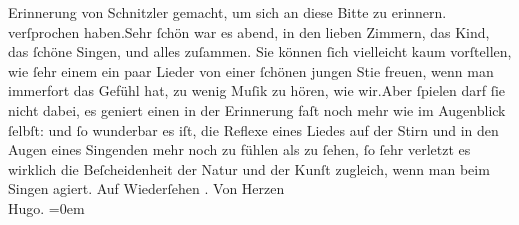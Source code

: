 \begin{ledgroupsized}[t]{13cm}
{{{                  Erinnerung von Schnitzler gemacht, um sich an diese
                  Bitte zu erinnern.}}}\label{T_L01319-1h} verſprochen haben.\hspace*{1.5em}Sehr ſchön war es \label{K_L01319-2v}\label{K_L01319-2h} abend, in den lieben Zimmern, das Kind, das ſchöne Singen, und alles zuſammen. Sie können
               ſich vielleicht kaum vorſtellen, wie ſehr einem ein paar Lieder von einer ſchönen
               jungen Sti{\geminationm}e freuen, wenn {\pb}man immerfort das Gefühl hat, zu
               wenig Muſik zu hören, wie wir.\hspace*{1.5em}Aber ſpielen darf ſie
               nicht dabei, es geniert einen in der Erinnerung faſt noch mehr wie im Augenblick
               ſelbſt: und ſo wunderbar es iſt, die Reflexe eines Liedes auf der Stirn und in den
               Augen eines Singenden mehr noch zu fühlen als zu ſehen, ſo ſehr {\pb}verletzt es wirklich die
               Beſcheidenheit der Natur und der Kunſt zugleich, wenn man beim Singen agiert.\pend
           \pstart
           Auf Wiederſehen \label{K_L01319-3v}\label{K_L01319-3h}.\pend
           \pstart
           Von Herzen{\\[\baselineskip]}\spacefill\mbox{Hugo.}\pend
           \leftskip=0em{}
         
         \endnumbering{}\end{ledgroupsized}  \newcommand{\dateiname}{L01319}\newcommand{\titel}{Hugo von Hofmannsthal an Arthur Schnitzler, 27. 9. [1903]}\newcommand{\editorInnen}{ Martin Anton Müller und Gerd-Hermann Susen}
      